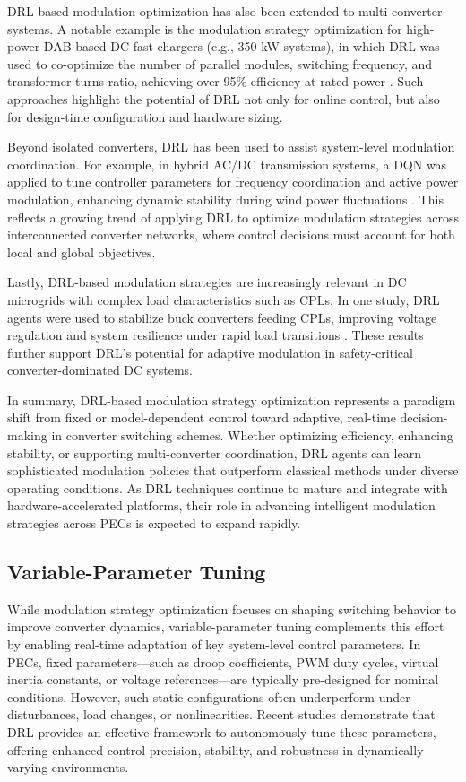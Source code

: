 DRL-based modulation optimization has also been extended to multi-converter systems. A notable example is the modulation strategy optimization for high-power DAB-based DC fast chargers (e.g., 350 kW systems), in which DRL was used to co-optimize the number of parallel modules, switching frequency, and transformer turns ratio, achieving over 95\% efficiency at rated power \cite{tang2020reinforcement}. Such approaches highlight the potential of DRL not only for online control, but also for design-time configuration and hardware sizing.

Beyond isolated converters, DRL has been used to assist system-level modulation coordination. For example, in hybrid AC/DC transmission systems, a DQN was applied to tune controller parameters for frequency coordination and active power modulation, enhancing dynamic stability during wind power fluctuations \cite{hui2024frequency}. This reflects a growing trend of applying DRL to optimize modulation strategies across interconnected converter networks, where control decisions must account for both local and global objectives.

Lastly, DRL-based modulation strategies are increasingly relevant in DC microgrids with complex load characteristics such as CPLs. In one study, DRL agents were used to stabilize buck converters feeding CPLs, improving voltage regulation and system resilience under rapid load transitions \cite{muhammad2025performance}. These results further support DRL's potential for adaptive modulation in safety-critical converter-dominated DC systems.

In summary, DRL-based modulation strategy optimization represents a paradigm shift from fixed or model-dependent control toward adaptive, real-time decision-making in converter switching schemes. Whether optimizing efficiency, enhancing stability, or supporting multi-converter coordination, DRL agents can learn sophisticated modulation policies that outperform classical methods under diverse operating conditions. As DRL techniques continue to mature and integrate with hardware-accelerated platforms, their role in advancing intelligent modulation strategies across PECs is expected to expand rapidly.

\subsection{Variable-Parameter Tuning}
\label{sec:ctrl_vartuning}

While modulation strategy optimization focuses on shaping switching behavior to improve converter dynamics, variable-parameter tuning complements this effort by enabling real-time adaptation of key system-level control parameters. In PECs, fixed parameters—such as droop coefficients, PWM duty cycles, virtual inertia constants, or voltage references—are typically pre-designed for nominal conditions. However, such static configurations often underperform under disturbances, load changes, or nonlinearities. Recent studies demonstrate that DRL provides an effective framework to autonomously tune these parameters, offering enhanced control precision, stability, and robustness in dynamically varying environments.

